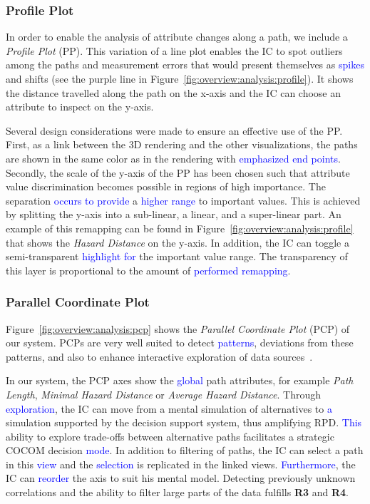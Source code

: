 \documentclass{egpubl}
\newcommand{\diff}[1]{\textcolor{blue}{#1}}
\begin{document}
\subsubsection{Profile Plot} \label{sec:overview:analysis:profile}
In order to enable the analysis of attribute changes along a path, we include a \emph{Profile Plot} (PP). This variation of a line plot enables the IC to spot outliers among the paths and measurement errors that would present themselves as \diff{spikes} and shifts (see the purple line in Figure~\ref{fig:overview:analysis:profile}). It shows the distance travelled along the path on the x-axis and the IC can choose an attribute to inspect on the y-axis.

Several design considerations were made to ensure an effective use of the PP. First, as a link between the 3D rendering and the other visualizations, the paths are shown in the same color as in the rendering with \diff{emphasized end points}. Secondly, the scale of the y-axis of the PP has been chosen such that attribute value discrimination becomes possible in regions of high importance. The separation \diff{occurs to provide} a \diff{higher range} to important values. This is achieved by splitting the y-axis into a sub-linear, a linear, and a super-linear part. An example of this remapping can be found in Figure~\ref{fig:overview:analysis:profile} that shows the \emph{Hazard Distance} on the y-axis. In addition, the IC can toggle a semi-transparent \diff{highlight for} the important value range. The transparency of this layer is proportional to the amount of \diff{performed remapping}.

\subsubsection{Parallel Coordinate Plot} \label{sec:overview:analysis:pcp}
Figure~\ref{fig:overview:analysis:pcp} shows the \emph{Parallel Coordinate Plot} (PCP) of our system. PCPs are very well suited to detect \diff{patterns}, deviations from these patterns, and also to enhance interactive exploration of data sources~\cite{Tory05aparallel}.

In our system, the PCP axes show the \diff{global} path attributes, for example \emph{Path Length}, \emph{Minimal Hazard Distance} or \emph{Average Hazard Distance}. Through \diff{exploration}, the IC can move from a mental simulation of alternatives to \diff{a} simulation supported by the decision support system, thus amplifying RPD. \diff{This} ability to explore trade-offs between alternative paths facilitates a strategic COCOM decision \diff{mode}. In addition to filtering of paths, the IC can select a path in this \diff{view} and the \diff{selection} is replicated in the linked views. \diff{Furthermore}, the IC can \diff{reorder} the axis to suit his mental model. Detecting previously unknown correlations and the ability to filter large parts of the data fulfills {\bfseries R3} and {\bfseries R4}.
\end{document}
